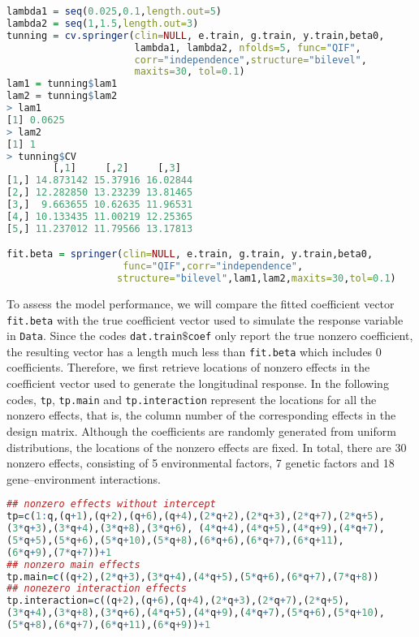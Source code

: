 \documentclass[12pt]{article}
\begin{document}
{\color{blue} 
\begin{lstlisting}[language=R]
lambda1 = seq(0.025,0.1,length.out=5)
lambda2 = seq(1,1.5,length.out=3)
tunning = cv.springer(clin=NULL, e.train, g.train, y.train,beta0,
                      lambda1, lambda2, nfolds=5, func="QIF", 
                      corr="independence",structure="bilevel",
                      maxits=30, tol=0.1)
lam1 = tunning$lam1
lam2 = tunning$lam2
> lam1
[1] 0.0625
> lam2
[1] 1
> tunning$CV
        [,1]     [,2]     [,3]
[1,] 14.873142 15.37916 16.02844
[2,] 12.282850 13.23239 13.81465
[3,]  9.663655 10.62635 11.96531
[4,] 10.133435 11.00219 12.25365
[5,] 11.237012 11.79566 13.17813

fit.beta = springer(clin=NULL, e.train, g.train, y.train,beta0,
                    func="QIF",corr="independence",
                   structure="bilevel",lam1,lam2,maxits=30,tol=0.1)
\end{lstlisting}
}

{\color{blue} To assess the model performance, we will compare the fitted coefficient vector \texttt{fit.beta} with the true coefficient vector used to simulate the response variable in \texttt{Data}. Since the codes \texttt{dat.train$\$$coef} only report the true nonzero coefficient, the resulting vector has a length much less than \texttt{fit.beta} which includes 0 coefficients. Therefore, we first retrieve locations of nonzero effects in the coefficient vector used to generate the longitudinal response. In the following codes, \texttt{tp}, \texttt{tp.main} and \texttt{tp.interaction} represent the locations for all the nonzero effects, that is, the column number of the corresponding effects in the design matrix. Although the coefficients are randomly generated from uniform distributions, the locations of the nonzero effects are fixed.} In total, there are 30 nonzero effects, consisting of 5 environmental factors, 7 genetic factors and 18 gene--environment interactions. 


\begin{lstlisting}[language=R]
## nonzero effects without intercept
tp=c(1:q,(q+1),(q+2),(q+6),(q+4),(2*q+2),(2*q+3),(2*q+7),(2*q+5),
(3*q+3),(3*q+4),(3*q+8),(3*q+6), (4*q+4),(4*q+5),(4*q+9),(4*q+7),
(5*q+5),(5*q+6),(5*q+10),(5*q+8),(6*q+6),(6*q+7),(6*q+11),
(6*q+9),(7*q+7))+1
## nonzero main effects
tp.main=c((q+2),(2*q+3),(3*q+4),(4*q+5),(5*q+6),(6*q+7),(7*q+8))  
## nonezero interaction effects
tp.interaction=c((q+2),(q+6),(q+4),(2*q+3),(2*q+7),(2*q+5),
(3*q+4),(3*q+8),(3*q+6),(4*q+5),(4*q+9),(4*q+7),(5*q+6),(5*q+10),
(5*q+8),(6*q+7),(6*q+11),(6*q+9))+1
\end{lstlisting}
\end{document}
